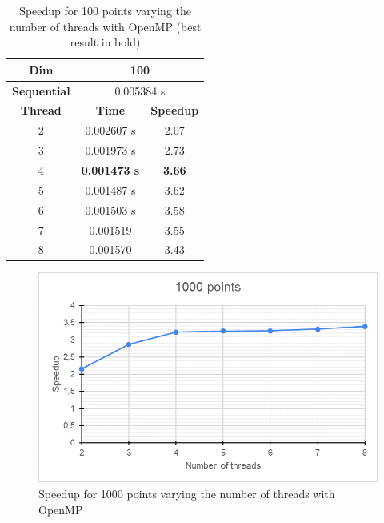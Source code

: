 \documentclass[10pt,twocolumn,letterpaper]{article}
\begin{document}
\begin{table}[]
\centering
\begin{tabular}{|c|c|c|}
\hline
\textbf{Dim} & \multicolumn{2}{c|}{100} \\ \hline
\textbf{Sequential} & \multicolumn{2}{c|}{0.005384 s} \\ \hline
\textbf{Thread} & \textbf{Time} & \textbf{Speedup} \\ \hline
2 & 0.002607 s & 2.07 \\ \hline
3 & 0.001973 s & 2.73 \\ \hline
4 & \textbf{0.001473 s} & \textbf{3.66} \\ \hline
5 & 0.001487 s & 3.62 \\ \hline
6 & 0.001503 s & 3.58 \\ \hline
7 & 0.001519 & 3.55 \\ \hline
8 & 0.001570 & 3.43 \\ \hline
\end{tabular}
\caption{Speedup for 100 points varying the number of threads with OpenMP (best result in bold)}
\label{tab:table100points}
\end{table}

\begin{figure}
\includegraphics[width=0.99\linewidth]{img/chart_1000_points}
\caption{Speedup for 1000 points varying the number of threads with OpenMP}
\label{fig:chart1000points}
\end{figure}
\end{document}
